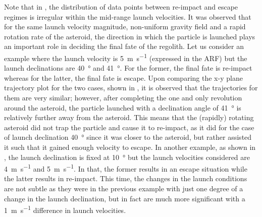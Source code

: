Note that in , the distribution of data points between re-impact and escape regimes is irregular within the mid-range launch velocities. It was observed that for the same launch velocity magnitude, non-uniform gravity field and a rapid rotation rate of the asteroid, the direction in which the particle is launched plays an important role in deciding the final fate of the regolith. Let us consider an example where the launch velocity is \SI{5}{\metre\per\second} (expressed in the \gls{ARF}) but the launch declinations are \SI{40}{\degree} and \SI{41}{\degree}. For the former, the final fate is re-impact whereas for the latter, the final fate is escape. Upon comparing the x-y plane trajectory plot for the two cases, shown in , it is observed that the trajectories for them are very similar; however, after completing the one and only revolution around the asteroid, the particle launched with a declination angle of \SI{41}{\degree} is relatively further away from the asteroid. This means that the (rapidly) rotating asteroid did not trap the particle and cause it to re-impact, as it did for the case of launch declination \SI{40}{\degree} since it was closer to the asteroid, but rather assisted it such that it gained enough velocity to escape.
%
\newline\newline
%
In another example, as shown in , the launch declination is fixed at \SI{10}{\degree} but the launch velocities considered are \SI{4}{\metre\per\second} and \SI{5}{\metre\per\second}. In that, the former results in an escape situation while the latter results in re-impact. This time, the changes in the launch conditions are not subtle as they were in the previous example with just one degree of a change in the launch declination, but in fact are much more significant with a \SI{1}{\metre\per\second} difference in launch velocities.
